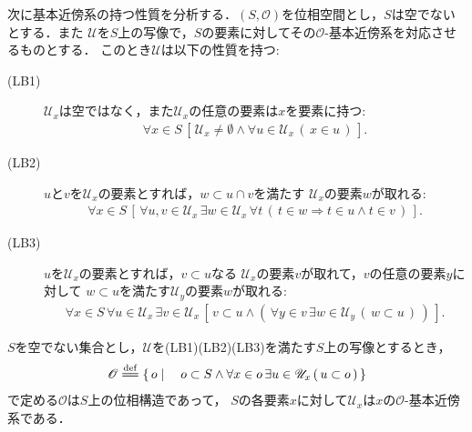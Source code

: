 	次に基本近傍系の持つ性質を分析する．$(S,\mathscr{O})$を位相空間とし，$S$は空でないとする．また
	$\mathscr{U}$を$S$上の写像で，$S$の要素に対してその$\mathscr{O}$-基本近傍系を対応させるものとする．
	このとき$\mathscr{U}$は以下の性質を持つ:
	\begin{description}
		\item[(LB1)] $\mathscr{U}_{x}$は空ではなく，また$\mathscr{U}_{x}$の任意の要素は$x$を要素に持つ:
			\begin{align}
				\forall x \in S\, \left[\, \mathscr{U}_{x} \neq \emptyset 
				\wedge \forall u \in \mathscr{U}_{x}\, (\, x \in u\, )\, \right].
			\end{align}

		\item[(LB2)] $u$と$v$を$\mathscr{U}_{x}$の要素とすれば，$w \subset u \cap v$を満たす
			$\mathscr{U}_{x}$の要素$w$が取れる:
			\begin{align}
				\forall x \in S\, 
				\left[\, \forall u,v \in \mathscr{U}_{x}\, \exists w \in \mathscr{U}_{x}\,
				\forall t\, \left(\, t \in w \Longrightarrow t \in u \wedge t \in v\, \right)\, \right].
			\end{align}
			
		\item[(LB3)] $u$を$\mathscr{U}_{x}$の要素とすれば，$v \subset u$なる
			$\mathscr{U}_{x}$の要素$v$が取れて，$v$の任意の要素$y$に対して
			$w \subset u$を満たす$\mathscr{U}_{y}$の要素$w$が取れる:
			\begin{align}
				\forall x \in S\, \forall u \in \mathscr{U}_{x}\, \exists v \in \mathscr{U}_{x}\,
				\left[\, v \subset u \wedge \left(\, \forall y \in v\,
				\exists w \in \mathscr{U}_{y}\, (\, w \subset u\, )\, \right)\, \right].
			\end{align}
	\end{description}
	
	\begin{screen}
		\begin{thm}[与えられた集合を基本近傍系とする位相の生成]
		\label{thm:a_local_base_restores_the_topology}
			$S$を空でない集合とし，$\mathscr{U}$を(LB1)(LB2)(LB3)を満たす$S$上の写像とするとき，
			\begin{align}
				\mathscr{O} \defeq
				\Set{o}{o \subset S \wedge \forall x \in o\, \exists u \in \mathscr{U}_{x}\, (\, u \subset o\, )}
			\end{align}
			で定める$\mathscr{O}$は$S$上の位相構造であって，
			$S$の各要素$x$に対して$\mathscr{U}_{x}$は$x$の$\mathscr{O}$-基本近傍系である．
		\end{thm}
	\end{screen}
	
